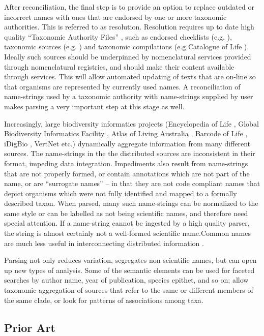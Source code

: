 \documentclass{bmcart}
\begin{document}
After reconciliation, the final step is to provide an option to replace outdated
or incorrect names with ones that are endorsed by one or more taxonomic
authorities. This is referred to as resolution. Resolution requires up to date
high quality ``Taxonomic Authority Files'' \cite{VandenBerghe2015}, such as
endorsed checklists (e.g. \cite{Zermoglio2016}), taxonomic sources (e.g.
\cite{Boyle2013}) and taxonomic compilations  (e.g Catalogue of Life
\cite{col}). Ideally such sources should be underpinned by nomenclatural
services provided through nomenclatural registries, and should make their
content available through services.  This will allow automated updating of
texts that are on-line so that organisms are represented by currently used
names. A reconciliation of name-strings used by a taxonomic authority with
name-strings supplied by user makes parsing a very important step at this stage
as well.

Increasingly, large biodiversity informatics projects (Encyclopedia of Life
\cite{eol}, Global Biodiversity Informatics Facility \cite{gbif}, Atlas of
Living Australia \cite{ala}, Barcode of Life \cite{bold}, iDigBio
\cite{idigbio}, VertNet \cite{vertnet} etc.) dynamically aggregate information
from many different sources. The name-strings in the the distributed sources
are inconsistent in their format, impeding data integration. Impediments also
result from name-strings that are not properly formed, or contain annotations
which are not part of the name, or are ``surrogate names'' – in that they are
not code compliant names that depict organisms which were not fully identified
and mapped to a formally described taxon. When parsed, many such name-strings
can be normalized to the same style or can be labelled as not being scientific
names, and therefore need special attention.  If a name-string cannot be
ingested by a high quality parser, the string is almost certainly not a
well-formed scientific name.Common names are much less useful in
interconnecting distributed information \cite{Patterson:inpress-a}.

Parsing not only reduces variation, segregates non scientific names, but can
open up new types of analysis.  Some of the semantic elements can be used for
faceted searches by author name, year of publication, species epithet, and so
on; allow taxonomic aggregation of sources that refer to the same or different
members of the same clade, or look for patterns of associations among taxa.

\subsection*{Prior Art}
\end{document}
